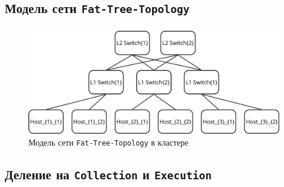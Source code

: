 \documentclass[t]{beamer}  %
\begin{document}
\subsection{Модель сети \texttt{Fat-Tree-Topology}}
\begin{frame}[fragile]
	\frametitle{\insertsection}
	\framesubtitle{\insertsubsection}

\begin{figure}[H]
	\centering 
	\includegraphics[width=\linewidth]{images/fat_tree_topology}
	\vspace{0.2cm}
	\caption*{Модель сети \texttt{Fat-Tree-Topology} в кластере}
\end{figure}
	\end{frame}

	\subsection{Деление на \texttt{Collection} и \texttt{Execution}}
\end{document}
